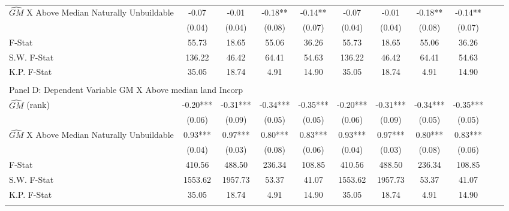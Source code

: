 \begin{table}[htbp]
\begin{threeparttable}
\begin{tabular}{l*{10}{c}}
\addlinespace
$\hat{GM}$ X Above Median Naturally Unbuildable&      -0.07   &      -0.01   &      -0.18** &      -0.14** &      -0.07   &      -0.01   &      -0.18** &      -0.14** \\
                &     (0.04)   &     (0.04)   &     (0.08)   &     (0.07)   &     (0.04)   &     (0.04)   &     (0.08)   &     (0.07)   \\
\midrule
F-Stat          &      55.73   &      18.65   &      55.06   &      36.26   &      55.73   &      18.65   &      55.06   &      36.26   \\
S.W. F-Stat     &     136.22   &      46.42   &      64.41   &      54.63   &     136.22   &      46.42   &      64.41   &      54.63   \\
K.P. F-Stat     &      35.05   &      18.74   &       4.91   &      14.90   &      35.05   &      18.74   &       4.91   &      14.90   \\
\cmidrule[\heavyrulewidth](lr){1-9} \\ \cmidrule[\heavyrulewidth](lr){1-9}
\multicolumn{8}{l}{Panel D: Dependent Variable GM X Above median land Incorp}\\
\cmidrule(lr){1-9}
$\hat{GM}$ (rank)&      -0.20***&      -0.31***&      -0.34***&      -0.35***&      -0.20***&      -0.31***&      -0.34***&      -0.35***\\
                &     (0.06)   &     (0.09)   &     (0.05)   &     (0.05)   &     (0.06)   &     (0.09)   &     (0.05)   &     (0.05)   \\
\addlinespace
$\hat{GM}$ X Above Median Naturally Unbuildable&       0.93***&       0.97***&       0.80***&       0.83***&       0.93***&       0.97***&       0.80***&       0.83***\\
                &     (0.04)   &     (0.03)   &     (0.08)   &     (0.06)   &     (0.04)   &     (0.03)   &     (0.08)   &     (0.06)   \\
\midrule
F-Stat          &     410.56   &     488.50   &     236.34   &     108.85   &     410.56   &     488.50   &     236.34   &     108.85   \\
S.W. F-Stat     &    1553.62   &    1957.73   &      53.37   &      41.07   &    1553.62   &    1957.73   &      53.37   &      41.07   \\
K.P. F-Stat     &      35.05   &      18.74   &       4.91   &      14.90   &      35.05   &      18.74   &       4.91   &      14.90   \\
\cmidrule[\heavyrulewidth](lr){1-9} \\ \cmidrule[\heavyrulewidth](lr){1-9}

\end{tabular}
\end{threeparttable}
\end{table}
